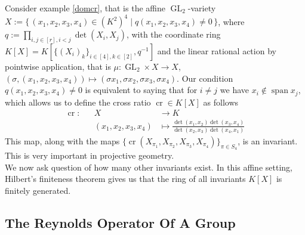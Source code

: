 \begin{dexample}
  Consider example \ref{domcr}, that is the affine $\operatorname{GL}_2$-variety $X := \{\, (x_1,x_2,x_3,x_4) \in (K^2)^4 \mid q(x_1,x_2,x_3,x_4) \neq 0 \,\}$, where $q := \prod_{i,j \in [r], i<j} \operatorname{det}(X_i,X_j)$, with the coordinate ring $K[X] = K[\{(X_i)_k\}_{i \in [4], k \in [2]},q^{-1}]$ and the linear rational action by pointwise application, that is $\mu \colon \operatorname{GL}_2 \times X \longrightarrow X$, $(\sigma,(x_1,x_2,x_3,x_4)) \mapsto (\sigma x_1,\sigma x_2,\sigma x_3,\sigma x_4)$.
  Our condition $q(x_1,x_2,x_3,x_4) \neq 0$ is equivalent to saying that for $i\neq j$ we have $x_i \notin \operatorname{span}{x_j}$, which allows us to define the cross ratio $\operatorname{cr} \in K[X]$ as follows
  \begin{equation}
    \begin{aligned}
      \operatorname{cr} \colon&&X&\longrightarrow K \\
      &&(x_1,x_2,x_3,x_4) &\longmapsto \frac{\operatorname{det}(x_1,x_2)\operatorname{det}(x_3,x_4)}{\operatorname{det}(x_2,x_3)\operatorname{det}(x_4,x_1)}
    \end{aligned}
  \end{equation}
  This map, along with the maps $\{\operatorname{cr}(X_{\pi_1},X_{\pi_2},X_{\pi_3},X_{\pi_4})\}_{\pi \in S_4}$, is an invariant.
  This is very important in projective geometry.\\
  We now ask question of how many other invariants exist.
  In this affine setting, Hilbert's finiteness theorem gives us that the ring of all invariants $K[X]$ is finitely generated.
\end{dexample}

\subsection{The Reynolds Operator Of A Group}



